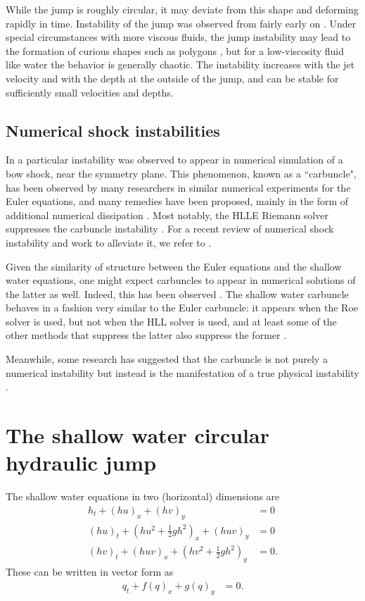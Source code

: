 \documentclass{article}
\begin{document}
While the jump is roughly circular, it may deviate from this shape and
deforming rapidly in time.
Instability of the jump was observed from fairly early on \cite{craik1981circular}.
Under special circumstances with more viscous fluids, the jump instability may lead to
the formation of curious shapes such as polygons \cite{ellegaard1998creating}, but
for a low-viscosity fluid like water the behavior is generally chaotic.
The instability increases with the jet velocity and with the depth at the outside of the jump,
and can be stable for sufficiently small velocities and depths.

\subsection{Numerical shock instabilities}

In \cite{peery1988blunt} a particular instability was observed to
appear in numerical simulation of a bow shock, near the symmetry plane.
This phenomenon, known as a ``carbuncle", has been observed by many researchers
in similar numerical experiments for the Euler equations, and many remedies
have been proposed, mainly in the form of additional numerical dissipation
\cite{quirk1997contribution,pandolfi2001numerical,dumbser2004matrix,chauvat2005shock,ismail2009proposed,shen2014stability}.
Most notably, the HLLE Riemann solver suppresses the carbuncle instability \cite{quirk1997contribution}.
For a recent review of numerical shock instability and work to alleviate it,
we refer to \cite[Section 2.5]{simonnumerical}.

Given the similarity of structure between the Euler equations and the shallow
water equations, one might expect carbuncles to appear in numerical
solutions of the latter as well.  Indeed, this has been observed \cite{kemm2014note}.
The shallow water carbuncle behaves in a fashion very similar to the
Euler carbuncle: it appears when the Roe solver is used, but not when
the HLL solver is used, and at least some of the other methods that suppress
the latter also suppress the former \cite{kemm2014note,bader2014carbuncle}.

Meanwhile, some research has suggested that the carbuncle is not purely a
numerical instability but instead is the manifestation of a true physical
instability \cite{moschetta2001carbuncle,elling2009carbuncle}.

\section{The shallow water circular hydraulic jump}
The shallow water equations in two (horizontal) dimensions are
\begin{align}
    h_t + (hu)_x + (hv)_y & = 0 \\
    (hu)_t + \left(hu^2 + \frac{1}{2}gh^2\right)_x + (huv)_y & = 0 \\
    (hv)_t + (huv)_x + \left(hv^2 + \frac{1}{2}gh^2\right)_y & = 0.
\end{align}
These can be written in vector form as
\begin{align}
    q_t + f(q)_x + g(q)_y & = 0.
\end{align}
\end{document}
